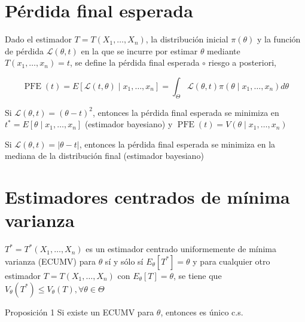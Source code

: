 \section*{Pérdida final esperada}
Dado el estimador $T=T\left(X_{1}, \ldots, X_{n}\right)$, la distribución inicial $\pi(\theta)$ y la función de pérdida $\mathcal{L}(\theta, t)$ en la que se incurre por estimar $\theta$ mediante $T\left(x_{1}, \ldots, x_{n}\right)=t$, se define la pérdida final esperada $\circ$ riesgo a posteriori,

$$
\operatorname{PFE}(t)=E\left[\mathcal{L}(t, \theta) \mid x_{1}, \ldots, x_{n}\right]=\int_{\Theta} \mathcal{L}(\theta, t) \pi\left(\theta \mid x_{1}, \ldots, x_{n}\right) d \theta
$$

Si $\mathcal{L}(\theta, t)=(\theta-t)^{2}$, entonces la pérdida final esperada se minimiza en $t^{*}=E\left[\theta \mid x_{1}, \ldots, x_{n}\right]$ (estimador bayesiano) y $\operatorname{PFE}(t)=V\left(\theta \mid x_{1}, \ldots, x_{n}\right)$

Si $\mathcal{L}(\theta, t)=|\theta-t|$, entonces la pérdida final esperada se minimiza en la mediana de la distribución final (estimador bayesiano)

\section*{Estimadores centrados de mínima varianza}
$T^{*}=T^{*}\left(X_{1}, \ldots, X_{n}\right)$ es un estimador centrado uniformemente de mínima varianza (ECUMV) para $\theta$ sí y sólo sí $E_{\theta}\left[T^{*}\right]=\theta$ y para cualquier otro estimador $T=T\left(X_{1}, \ldots, X_{n}\right)$ con $E_{\theta}[T]=\theta$, se tiene que $V_{\theta}\left(T^{*}\right) \leq V_{\theta}(T), \forall \theta \in \Theta$

Proposición 1 Si existe un ECUMV para $\theta$, entonces es único c.s.

